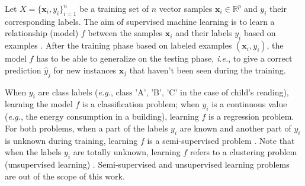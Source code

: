 Let $X=\{\textbf{x}_i,y_i\}_{i=1}^n$ be a training set of $n$ vector samples $\textbf{x}_i \in \mathbb{R}^p$ and $y_i$ their corresponding labels. The aim of supervised machine learning is to learn a relationship (model) $f$ between the samples $\textbf{x}_i$ and their labels $y_i$ based on examples \cite{Bishop2006,Dreyfus2006,Duda1973}. %
After the training phase based on labeled examples $(\textbf{x}_i,y_i)$, the model $f$ has to be able to generalize on the testing phase, \textit{i.e.}, to give a correct prediction $\hat{y}_j$ for new instances $\textbf{x}_j$ that haven't been seen during the training.

When $y_i$ are class labels (\textit{e.g.}, class 'A', 'B', 'C' in the case of child's reading), learning the model $f$ is a classification problem; when $y_i$ is a continuous value (\textit{e.g.}, the energy consumption in a building), learning $f$ is a regression problem. 
For both problems, when a part of the labels $y_i$ are known and another part of $y_i$ is unknown during training, learning $f$ is a semi-supervised problem \cite{Zhu2007}. Note that when the labels $y_i$ are totally unknown, learning $f$ refers to a clustering problem (unsupervised learning) \cite{Jain1999,Chen1996}. Semi-supervised and unsupervised learning problems are out of the scope of this work.




